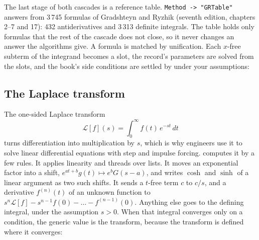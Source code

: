 \begin{codepairs}
\end{codepairs}

The last stage of both cascades is a reference table. \texttt{Method -> "GRTable"}
answers from 3\,745 formulas of Gradshteyn and Ryzhik (seventh edition, chapters
2--7 and 17): 432 antiderivatives and 3\,313 definite
integrals. The table holds only formulas that
the rest of the cascade does not close, so it never changes an answer the
algorithms give. A formula is matched by unification. Each \(x\)-free subterm of
the integrand becomes a slot, the record's parameters are solved from the slots, and
the book's side conditions are settled by  under your assumptions:

\begin{codepairs}
\end{codepairs}


\subsection{The Laplace transform}
\label{ssec:calc-laplace}

The one-sided Laplace transform
\[
  \mathcal{L}[f](s) = \int_0^\infty f(t)\,e^{-st}\,dt
\]
turns differentiation into multiplication by \(s\), which is why engineers use it
to solve linear differential equations with step and impulse forcing.
 computes it by a few rules. It applies linearity
and threads over lists. It moves an exponential factor into a shift,
\(e^{at+b}g(t) \mapsto e^b G(s-a)\), and writes \(\cosh\) and \(\sinh\) of a linear
argument as two such shifts. It sends a \(t\)-free term \(c\) to \(c/s\), and a
derivative \(f^{(n)}(t)\) of an unknown function to
\(s^n\mathcal{L}[f]-s^{n-1}f(0)-\dots-f^{(n-1)}(0)\). Anything else goes to the
defining integral, under the assumption \(s>0\). When that integral converges only on
a condition, the generic value is the transform, because the transform is defined
where it converges:

